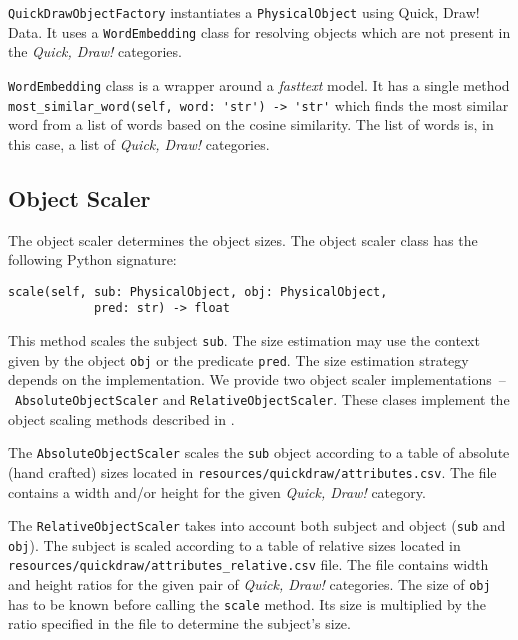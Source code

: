 \verb|QuickDrawObjectFactory| instantiates a \verb|PhysicalObject| using Quick, Draw! \citep{quickdraw} Data. It uses a \verb|WordEmbedding| class for resolving objects which are not present in the \emph{Quick, Draw!} categories.

\medskip

\verb|WordEmbedding| class is a wrapper around a \emph{fasttext}  \citep{bojanowski2017enriching} model. It has a single method \verb|most_similar_word(self, word: 'str') -> 'str'| which finds the most similar word from a list of words based on the cosine similarity. The list of words is, in this case, a list of \emph{Quick, Draw!} categories.

\subsection{Object Scaler}

The object scaler determines the object sizes. The object scaler class has the following Python signature:

\begin{verbatim}
scale(self, sub: PhysicalObject, obj: PhysicalObject, 
            pred: str) -> float
\end{verbatim}

This method scales the subject \verb|sub|. The size estimation may use the context given by the object \verb|obj| or the predicate \verb|pred|. The size estimation strategy depends on the implementation. We provide two object scaler implementations~--~\verb|AbsoluteObjectScaler| and \verb|RelativeObjectScaler|. These clases implement the object scaling methods described in .

\medskip

The \verb|AbsoluteObjectScaler| scales the \verb|sub| object according to a table of absolute (hand crafted) sizes located in \verb|resources/quickdraw/attributes.csv|. The file contains a width and/or height for the given \emph{Quick, Draw!} category.

\medskip

The \verb|RelativeObjectScaler| takes into account both subject and object (\verb|sub| and \verb|obj|). The subject is scaled according to a table of relative sizes located in \verb|resources/quickdraw/attributes_relative.csv| file. The file contains width and height ratios for the given pair of \emph{Quick, Draw!} categories. The size of \verb|obj| has to be known before calling the \verb|scale| method. Its size is multiplied by the ratio specified in the file to determine the subject's size.

